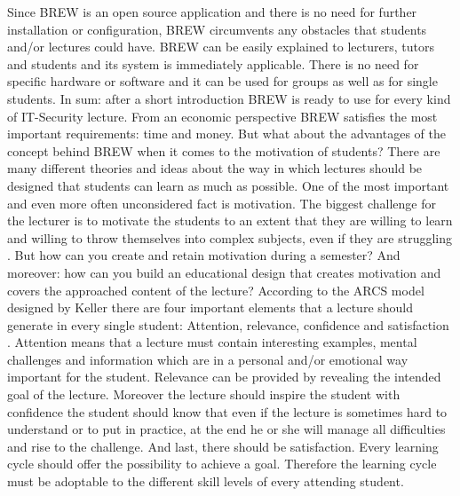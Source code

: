 \documentclass{llncs}
\begin{document}
Since BREW is an open source application and there is no need for further installation or configuration, BREW circumvents any obstacles that students and/or lectures could have. BREW can be easily explained to lecturers, tutors and students and its system is immediately applicable.
There is no need for specific hardware or software and it can be used for groups as well as for single students.
In sum: after a short introduction BREW is ready to use for every kind of IT-Security lecture.
From an economic perspective BREW satisfies the most important requirements: time and money.
But what about the advantages of the concept behind BREW when it comes to the motivation of students?
There are many different theories and ideas about the way in which lectures should be designed that students can learn as much as possible.
One of the most important and even more often unconsidered fact is motivation.
The biggest challenge for the lecturer is to motivate the students to an extent that they are willing to learn and willing to throw themselves into complex subjects, even if they are struggling \cite{Kluver:2012fs,Lipowsky:ue}.
But how can you create and retain motivation during a semester?
And moreover: how can you build an educational design that creates motivation and covers the approached content of the lecture?
According to the ARCS model designed by Keller there are four important elements that a lecture should generate in every single student: Attention, relevance, confidence and satisfaction \cite{Hubwieser:2007vs,Keller:1987we,Keller:1987uo}.
Attention means that a lecture must contain interesting examples, mental challenges and information which are in a personal and/or emotional way important for the student.
Relevance can be provided by revealing the intended goal of the lecture.
Moreover the lecture should inspire the student with confidence the student should know that even if the lecture is sometimes hard to understand or to put in practice, at the end he or she will manage all difficulties and rise to the challenge.
And last, there should be satisfaction.
Every learning cycle should offer the possibility to achieve a goal.
Therefore the learning cycle must be adoptable to the different skill levels of every attending student.
 
\end{document}
